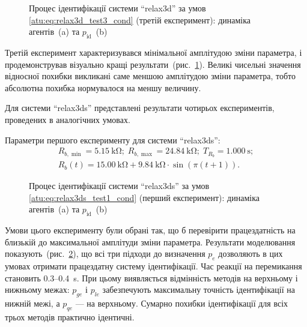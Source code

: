 \begin{figure}[htb!]
  \caption{Процес ідентифікації системи ``relax3d'' за умов \ref{atu:eq:relax3d_test3_cond} (третій експеримент): динаміка агентів~(a) та $p_\mathrm{id}$~(b)}
\label{atu:f:relax3d_id_3}
\end{figure}

Третій експеримент характеризувався мінімальної амплітудою
зміни параметра, і продемонстрував візуально кращі
результати~(рис.~\ref{atu:f:relax3d_id_3}). Великі чисельні значення
відносної похибки викликані саме меншою амплітудою зміни
параметра, тобто абсолютна похибка нормувалося на меншу
величину.




Для системи ``relax3ds'' представлені результати чотирьох
експериментів, проведених в аналогічних умовах.

Параметри першого експерименту для системи ``relax3ds'':
%
\begin{equation}
  \begin{array}{c}
    R_{b,\min} = \SI{5.15}{\kilo\ohm};
    \;
    R_{b,\max} = \SI{24.84}{\kilo\ohm};
    \;
    T_{R_b} = \SI{1.000}{\second};
  \\
    R_b(t) = \SI{15.00}{\kilo\ohm} + \SI{9.84}{\kilo\ohm} \cdot \sin( \pi ( t + 1 ) ).
  \end{array}
  \label{atu:eq:relax3ds_test1_cond}
\end{equation}


\begin{figure}[htb!]
  \caption{Процес ідентифікації системи ``relax3ds'' за умов \ref{atu:eq:relax3ds_test1_cond} (перший експеримент): динаміка агентів~(a) та $p_\mathrm{id}$~(b)}
  \label{atu:f:relax3ds_id_0}
\end{figure}

Умови цього експерименту були обрані так, що б перевірити
працездатність на близькій до максимальної амплітуди зміни
параметра. Результати моделювання показують~(рис.~\ref{atu:f:relax3ds_id_0}),
що всі три підходи до визначення
$p_e $ дозволяють в цих умовах отримати працездатну систему
ідентифікації. Час реакції на перемикання становить 0.3--0.4~s. При
цьому виявляється відмінність методів на верхньому і нижньому
межах: $p_{ge}$ і
$p_{le}$ забезпечують максимальну точність ідентифікації на нижній межі, а
$p_{qe}$ --- на верхньому. Сумарно похибки ідентифікації для всіх трьох методів практично ідентичні.



